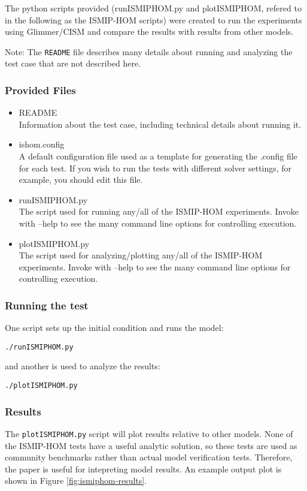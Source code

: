 The python scripts provided (runISMIPHOM.py and plotISMIPHOM, refered to
in the following as the ISMIP-HOM scripts) were created to run the experiments
using Glimmer/CISM and compare the results with results from other models.

Note: The \texttt{README} file describes many details about running and analyzing the
test case that are not described here.

\subsubsection{Provided Files}

\begin{itemize}
	\item README \\
		Information about the test case, including technical details about running it.
	\item ishom.config \\
		A default configuration file used as a template for generating the .config file for each test.
    If you wish to run the tests with different solver settings, for example, you should edit this file.
	\item runISMIPHOM.py \\
		The script used for running any/all of the ISMIP-HOM experiments.  
    Invoke with --help to see the many command line options for controlling execution.
  \item plotISMIPHOM.py \\
		The script used for analyzing/plotting any/all of the ISMIP-HOM experiments.  
    Invoke with --help to see the many command line options for controlling execution.
\end{itemize}

\subsubsection{Running the test}
One script sets up the initial condition and runs the model:

\texttt{./runISMIPHOM.py}

and another is used to analyze the results:

\texttt{./plotISMIPHOM.py}

\subsubsection{Results}
The \texttt{plotISMIPHOM.py} script will plot results relative to other models.
None of the ISMIP-HOM tests have a useful analytic solution, so these tests are
used as community benchmarks rather than actual model verification tests.
Therefore, the \citet{Pattyn2008} paper is useful for intepreting model results.
An example output plot is shown in Figure \ref{fig:ismiphom-results}.


